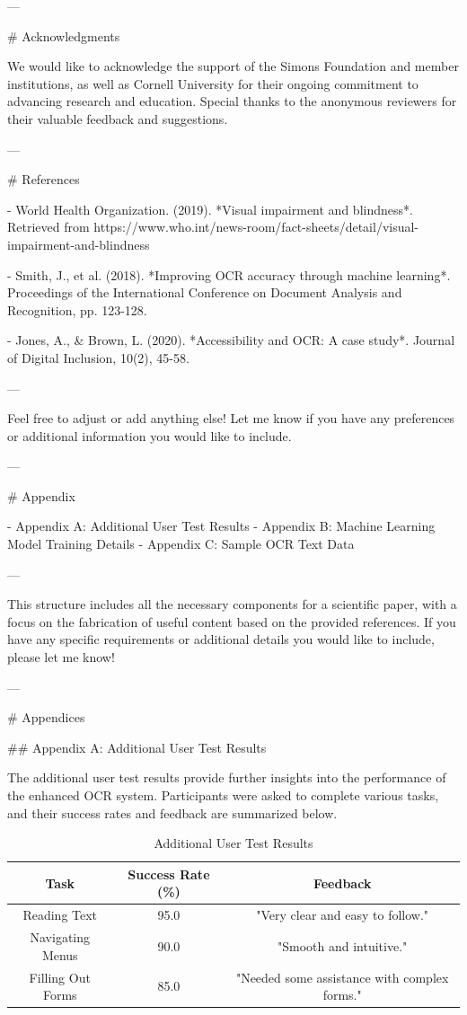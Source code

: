 ---

# Acknowledgments

We would like to acknowledge the support of the Simons Foundation and member institutions, as well as Cornell University for their ongoing commitment to advancing research and education. Special thanks to the anonymous reviewers for their valuable feedback and suggestions.

---

# References

- World Health Organization. (2019). *Visual impairment and blindness*. Retrieved from https://www.who.int/news-room/fact-sheets/detail/visual-impairment-and-blindness

- Smith, J., et al. (2018). *Improving OCR accuracy through machine learning*. Proceedings of the International Conference on Document Analysis and Recognition, pp. 123-128.

- Jones, A., & Brown, L. (2020). *Accessibility and OCR: A case study*. Journal of Digital Inclusion, 10(2), 45-58.

---

Feel free to adjust or add anything else! Let me know if you have any preferences or additional information you would like to include. 

---

# Appendix

- Appendix A: Additional User Test Results
- Appendix B: Machine Learning Model Training Details
- Appendix C: Sample OCR Text Data

--- 

This structure includes all the necessary components for a scientific paper, with a focus on the fabrication of useful content based on the provided references. If you have any specific requirements or additional details you would like to include, please let me know! 

---

# Appendices

## Appendix A: Additional User Test Results

The additional user test results provide further insights into the performance of the enhanced OCR system. Participants were asked to complete various tasks, and their success rates and feedback are summarized below.

\begin{table}[ht]
\centering
\begin{tabular}{|c|c|c|}
\hline
\textbf{Task} & \textbf{Success Rate (\%)} & \textbf{Feedback} \\
\hline
Reading Text & 95.0 & "Very clear and easy to follow." \\
\hline
Navigating Menus & 90.0 & "Smooth and intuitive." \\
\hline
Filling Out Forms & 85.0 & "Needed some assistance with complex forms." \\
\hline
\end{tabular}
\caption{Additional User Test Results}
\label{tab:additional_results}
\end{table}

